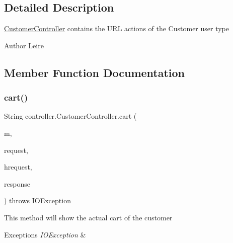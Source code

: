 \subsection{Detailed Description}
\mbox{\hyperlink{classcontroller_1_1_customer_controller}{Customer\+Controller}} contains the U\+RL actions of the Customer user type

\begin{DoxyAuthor}{Author}
Leire 
\end{DoxyAuthor}


\subsection{Member Function Documentation}
\mbox{\label{classcontroller_1_1_customer_controller_a90aa906ff9e90be62b82941992350235}} 
\subsubsection{\texorpdfstring{cart()}{cart()}}
{\footnotesize\ttfamily String controller.\+Customer\+Controller.\+cart (\begin{DoxyParamCaption}\item[{Model}]{m,  }\item[{Web\+Request}]{request,  }\item[{Http\+Servlet\+Request}]{hrequest,  }\item[{Http\+Servlet\+Response}]{response }\end{DoxyParamCaption}) throws I\+O\+Exception\hspace{0.3cm}{\ttfamily [inline]}}

This method will show the actual cart of the customer 
\begin{DoxyExceptions}{Exceptions}
{\em I\+O\+Exception} & \\
\hline
\end{DoxyExceptions}
\mbox{\label{classcontroller_1_1_customer_controller_add866b64d6e08876db8b97087eaeb389}} 
